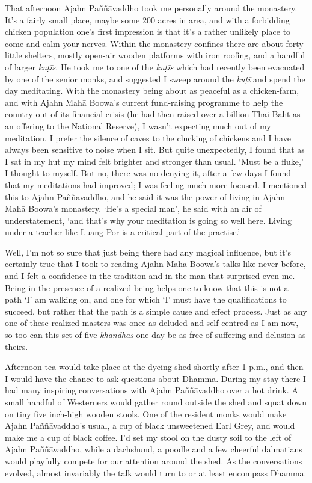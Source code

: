 That afternoon Ajahn Paññāvaddho took me personally around the
monastery. It's a fairly small place, maybe some 200 acres in area, and
with a forbidding chicken population one's first impression is that it's
a rather unlikely place to come and calm your nerves. Within the
monastery confines there are about forty little shelters, mostly
open-air wooden platforms with iron roofing, and a handful of larger
\emph{kuṭīs}. He took me to one of the \emph{kuṭīs} which had recently
been evacuated by one of the senior monks, and suggested I sweep around
the \emph{kuṭī} and spend the day meditating. With the monastery being
about as peaceful as a chicken-farm, and with Ajahn Mahā Boowa's current
fund-raising programme to help the country out of its financial crisis
 (he had then raised over a billion Thai Baht as an offering to the
National Reserve), I wasn't expecting much out of my meditation. I
prefer the silence of caves to the clucking of chickens and I have
always been sensitive to noise when I sit. But quite unexpectedly, I
found that as I sat in my hut my mind felt brighter and stronger than
usual. `Must be a fluke,' I thought to myself. But no, there was no
denying it, after a few days I found that my meditations had improved; I
was feeling much more focused. I mentioned this to Ajahn Paññāvaddho, 
and he said it was the power of living in Ajahn Mahā Boowa's monastery. 
`He's a special man', he said with an air of understatement, `and that's
why your meditation is going so well here. Living under a teacher like
Luang Por is a critical part of the practise.'

Well, I'm not so sure that
just being there had any magical influence, but it's certainly true that
I took to reading Ajahn Mahā Boowa's talks like never before, and I felt
a confidence in the tradition and in the man that surprised even me. 
Being in the presence of a realized being helps one to know that this is
not a path `I' am walking on, and one for which `I' must have the
qualifications to succeed, but rather that the path is a simple cause
and effect process. Just as any one of these realized masters was once
as deluded and self-centred as I am now, so too can this set of five
\emph{khandhas} one day be as free of suffering and delusion as theirs. 

Afternoon tea would take place at the dyeing shed shortly after 1 p.m.,
and then I would have the chance to ask questions about Dhamma. During
my stay there I had many inspiring conversations with Ajahn Paññāvaddho
over a hot drink. A small handful of Westerners would gather round
outside the shed and squat down on tiny five inch-high wooden stools. 
One of the resident monks would make Ajahn Paññāvaddho's usual, a cup of
black unsweetened Earl Grey, and would make me a cup of black coffee. 
I'd set my stool on the dusty soil to the left of Ajahn Paññāvaddho, 
while a dachshund, a poodle and a few cheerful dalmatians would
playfully compete for our attention around the shed. As the
conversations evolved, almost invariably the talk would turn to or at
least encompass Dhamma. 

